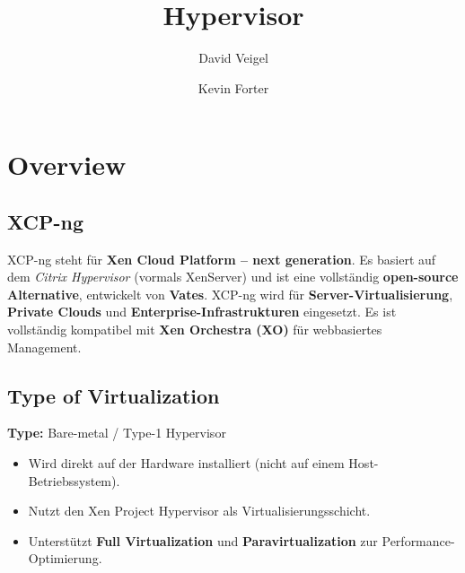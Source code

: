 \documentclass[BMR,Seminar,ngerman,IEEE]{twbook}
\title{Hypervisor}
\author{David Veigel \and Kevin Forter}
\begin{document}
\maketitle

\onecolumn
\newpage

\chapter{Overview}

\section{XCP-ng}
XCP-ng steht für \textbf{Xen Cloud Platform – next generation}.  
Es basiert auf dem \textit{Citrix Hypervisor} (vormals XenServer) und ist eine vollständig \textbf{open-source Alternative}, entwickelt von \textbf{Vates}.  
XCP-ng wird für \textbf{Server-Virtualisierung}, \textbf{Private Clouds} und \textbf{Enterprise-Infrastrukturen} eingesetzt.  
Es ist vollständig kompatibel mit \textbf{Xen Orchestra (XO)} für webbasiertes Management.

\section{Type of Virtualization}
\textbf{Type:} Bare-metal / Type-1 Hypervisor  

\begin{itemize}[noitemsep]
  \item Wird direkt auf der Hardware installiert (nicht auf einem Host-Betriebssystem).
  \item Nutzt den Xen Project Hypervisor als Virtualisierungsschicht.
  \item Unterstützt \textbf{Full Virtualization} und \textbf{Paravirtualization} zur Performance-Optimierung.
\end{itemize}

\end{document}
